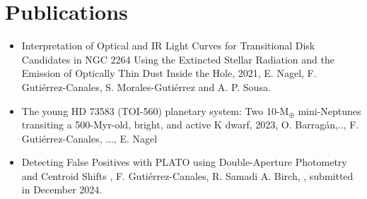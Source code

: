 \documentclass[11pt,a4paper]{article}
\begin{document}
	\section{Publications}
	\begin{itemize}
		\item Interpretation of Optical and IR Light Curves for Transitional Disk Candidates in NGC 2264 Using the Extincted Stellar Radiation and the Emission of Optically Thin Dust Inside the Hole, 2021, E. Nagel, F. Gutiérrez-Canales, S. Morales-Gutiérrez and A. P. Sousa.
		\item The young HD 73583 (TOI-560) planetary system: Two 10-M$_{\oplus}$ mini-Neptunes transiting a 500-Myr-old, bright, and active K dwarf, 2023, O. Barrag\'an,.., F. Gutiérrez-Canales, ..., E. Nagel
		\item Detecting False Positives with PLATO using Double-Aperture Photometry and Centroid Shifts , F. Gutiérrez-Canales, R. Samadi A. Birch, , submitted in December 2024.
	\end{itemize}
	
\end{document}
